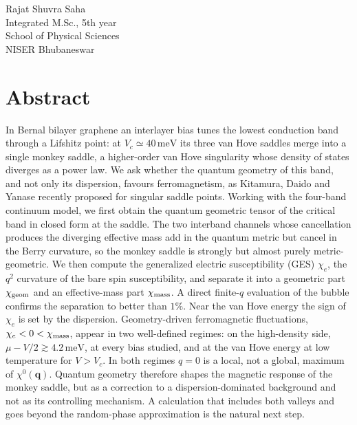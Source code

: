 \documentclass[12pt,a4paper]{article}
\newcommand{\bq}{\mathbf{q}}
\newcommand{\chie}{\chi_{e}}
\newcommand{\chig}{\chi_{\rm geom}}
\newcommand{\chim}{\chi_{\rm mass}}
\newcommand{\meV}{\,\mathrm{meV}}
\begin{document}
\vspace{1cm}
\begin{flushright}
Rajat Shuvra Saha\\
Integrated M.Sc., 5th year\\
School of Physical Sciences\\
NISER Bhubaneswar
\end{flushright}

\clearpage

\section*{Abstract}

In Bernal bilayer graphene an interlayer bias tunes the lowest conduction band through a Lifshitz point: at $V_c\simeq40\meV$ its three van Hove saddles merge into a single monkey saddle, a higher-order van Hove singularity whose density of states diverges as a power law. We ask whether the quantum geometry of this band, and not only its dispersion, favours ferromagnetism, as Kitamura, Daido and Yanase recently proposed for singular saddle points. Working with the four-band continuum model, we first obtain the quantum geometric tensor of the critical band in closed form at the saddle. The two interband channels whose cancellation produces the diverging effective mass add in the quantum metric but cancel in the Berry curvature, so the monkey saddle is strongly but almost purely metric-geometric. We then compute the generalized electric susceptibility (GES) $\chie$, the $q^2$ curvature of the bare spin susceptibility, and separate it into a geometric part $\chig$ and an effective-mass part $\chim$. A direct finite-$q$ evaluation of the bubble confirms the separation to better than $1\%$. Near the van Hove energy the sign of $\chie$ is set by the dispersion. Geometry-driven ferromagnetic fluctuations, $\chie<0<\chim$, appear in two well-defined regimes: on the high-density side, $\mu-V/2\gtrsim4.2\meV$, at every bias studied, and at the van Hove energy at low temperature for $V>V_c$. In both regimes $q=0$ is a local, not a global, maximum of $\chi^0(\bq)$. Quantum geometry therefore shapes the magnetic response of the monkey saddle, but as a correction to a dispersion-dominated background and not as its controlling mechanism. A calculation that includes both valleys and goes beyond the random-phase approximation is the natural next step.
\end{document}
